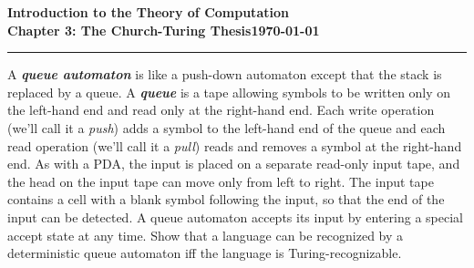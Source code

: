 \documentclass[11pt]{article}
\newcommand{\dated}{\today}
\begin{document}
\textbf{Introduction to the Theory of
Computation}\hfill\textbf{\myname}\\[0.01in]
\textbf{Chapter 3: The Church-Turing Thesis}\hfill\textbf{\dated}\\
\smallskip\hrule\bigskip

\begin{problem}{3.14}
A \textbf{\textit{queue automaton}} is like a push-down automaton except that the stack is replaced by a queue. A \textbf{\textit{queue}} is a tape allowing symbols to be written only on the left-hand end and read only at the right-hand end. Each write operation (we’ll call it a \textit{push}) adds a symbol to the left-hand end of the queue and each read operation (we'll call it a \textit{pull}) reads and removes a symbol at the right-hand end. As with a PDA, the input is placed on a separate read-only input tape, and the head on the input tape can move only from left to right. The input tape contains a cell with a blank symbol following the input, so that the end of the input can be detected. A queue automaton accepts its input by entering a special accept state at any time. Show that a language can be recognized by a deterministic queue automaton iff the language is Turing-recognizable.
\end{problem}
\end{document}
